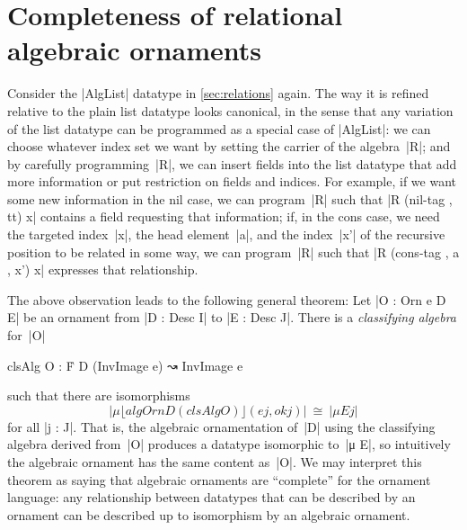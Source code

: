 \section{Completeness of relational algebraic ornaments}
\label{sec:completeness}

Consider the |AlgList| datatype in \autoref{sec:relations} again.
The way it is refined relative to the plain list datatype looks canonical, in the sense that any variation of the list datatype can be programmed as a special case of |AlgList|:
we can choose whatever index set we want by setting the carrier of the algebra~|R|; and by carefully programming~|R|, we can insert fields into the list datatype that add more information or put restriction on fields and indices.
For example, if we want some new information in the nil case, we can program~|R| such that |R (nil-tag , tt) x| contains a field requesting that information; if, in the cons case, we need the targeted index~|x|, the head element~|a|, and the index~|x'| of the recursive position to be related in some way, we can program~|R| such that |R (cons-tag , a , x') x| expresses that relationship.

The above observation leads to the following general theorem:
Let |O : Orn e D E| be an ornament from |D : Desc I| to |E : Desc J|.
There is a \emph{classifying algebra} for~|O|
\begin{code}clsAlg O : Ḟ D (InvImage e) ↝ InvImage e
\end{code}such that there are isomorphisms
\[ |μ ⌊ algOrn D (clsAlg O) ⌋ (e j , ok j)| ~\cong~ |μ E j| \]
for all |j : J|.
That is, the algebraic ornamentation of~|D| using the classifying algebra derived from~|O| produces a datatype isomorphic to~|μ E|, so intuitively the algebraic ornament has the same content as~|O|.
We may interpret this theorem as saying that algebraic ornaments are ``complete'' for the ornament language: any relationship between datatypes that can be described by an ornament can be described up to isomorphism by an algebraic ornament.

